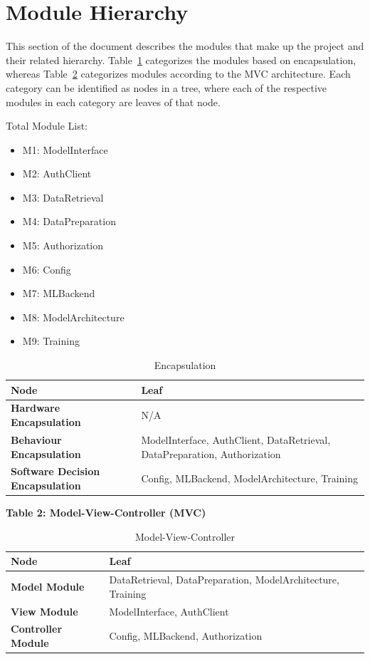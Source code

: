 \documentclass[12pt, titlepage]{article}
\begin{document}
\section{Module Hierarchy} \label{SecMH}
This section of the document describes the modules that make up the project and their related hierarchy. Table~\ref{TblEncapsulation} categorizes the modules based on encapsulation, whereas Table~\ref{TblMVC} categorizes modules according to the MVC architecture. Each category can be identified as nodes in a tree, where each of the respective modules in each category are leaves of that node.

Total Module List:

\begin{itemize}
    \item M1: ModelInterface
    \item M2: AuthClient
    \item M3: DataRetrieval
    \item M4: DataPreparation
    \item M5: Authorization
    \item M6: Config
    \item M7: MLBackend
    \item M8: ModelArchitecture
    \item M9: Training
\end{itemize}

\begin{table}[h!]
\centering
\begin{tabular}{|p{}|p{}|}
\hline
\textbf{Node} & \textbf{Leaf} \\
\hline
\textbf{Hardware Encapsulation} & N/A \\
\hline
\textbf{Behaviour Encapsulation} & ModelInterface, AuthClient, DataRetrieval, DataPreparation, Authorization \\
\hline
\textbf{Software Decision Encapsulation} & Config, MLBackend, ModelArchitecture, Training \\
\hline
\end{tabular}
\caption{Encapsulation}
\label{TblEncapsulation}
\end{table}

\textbf{Table 2: Model-View-Controller (MVC)}
\begin{table}[h!]
\centering
\begin{tabular}{|l|l|}
\hline
\textbf{Node} & \textbf{Leaf} \\
\hline
\textbf{Model Module} & DataRetrieval, DataPreparation, ModelArchitecture, Training \\
\hline
\textbf{View Module} & ModelInterface, AuthClient \\
\hline
\textbf{Controller Module} & Config, MLBackend, Authorization \\
\hline
\end{tabular}
\caption{Model-View-Controller}
\label{TblMVC}
\end{table}
\end{document}
